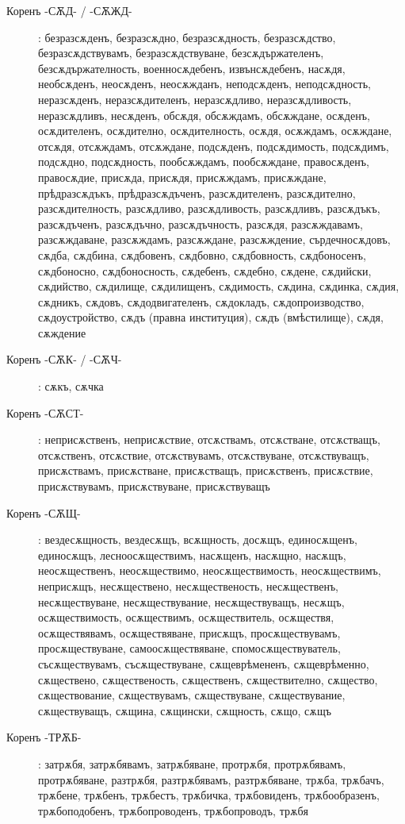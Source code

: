 \documentclass{article}
\begin{document}
\begin{description}
	\item[Коренъ -СѪД- / -СѪЖД-]: безразсѫденъ, безразсѫдно, безразсѫдность, безразсѫдство, безразсѫдствувамъ, безразсѫдствуване, безсѫдържателенъ, безсѫдържателность, военносѫдебенъ, извънсѫдебенъ, насѫдя, необсѫденъ, неосѫденъ, неосѫжданъ, неподсѫденъ, неподсѫдность, неразсѫденъ, неразсѫдителенъ, неразсѫдливо, неразсѫдливость, неразсѫдливъ, несѫденъ, обсѫдя, обсѫждамъ, обсѫждане, осѫденъ, осѫдителенъ, осѫдително, осѫдителность, осѫдя, осѫждамъ, осѫждане, отсѫдя, отсѫждамъ, отсѫждане, подсѫденъ, подсѫдимость, подсѫдимъ, подсѫдно, подсѫдность, пообсѫждамъ, пообсѫждане, правосѫденъ, правосѫдие, присѫда, присѫдя, присѫждамъ, присѫждане, прѣдразсѫдъкъ, прѣдразсѫдъченъ, разсѫдителенъ, разсѫдително, разсѫдителность, разсѫдливо, разсѫдливость, разсѫдливъ, разсѫдъкъ, разсѫдъченъ, разсѫдъчно, разсѫдъчность, разсѫдя, разсѫждавамъ, разсѫждаване, разсѫждамъ, разсѫждане, разсѫждение, сърдечносѫдовъ, сѫдба, сѫдбина, сѫдбовенъ, сѫдбовно, сѫдбовность, сѫдбоносенъ, сѫдбоносно, сѫдбоносность, сѫдебенъ, сѫдебно, сѫдене, сѫдийски, сѫдийство, сѫдилище, сѫдилищенъ, сѫдимость, сѫдина, сѫдинка, сѫдия, сѫдникъ, сѫдовъ, сѫдодвигателенъ, сѫдокладъ, сѫдопроизводство, сѫдоустройство, сѫдъ (правна институция), сѫдъ (вмѣстилище), сѫдя, сѫждение
	
	\item[Коренъ -СѪК- / -СѪЧ-]: сѫкъ, сѫчка
	
	\item[Коренъ -СѪСТ-]: неприсѫственъ, неприсѫствие, отсѫствамъ, отсѫстване, отсѫстващъ, отсѫственъ, отсѫствие, отсѫствувамъ, отсѫствуване, отсѫствуващъ, присѫствамъ, присѫстване, присѫстващъ, присѫственъ, присѫствие, присѫствувамъ, присѫствуване, присѫствуващъ
	
	\item[Коренъ -СѪЩ-]: вездесѫщность, вездесѫщъ, всѫщность, досѫщъ, единосѫщенъ, единосѫщъ, лесноосѫществимъ, насѫщенъ, насѫщно, насѫщъ, неосѫщественъ, неосѫществимо, неосѫществимость, неосѫществимъ, неприсѫщъ, несѫществено, несѫщественость, несѫщественъ, несѫществуване, несѫществувание, несѫществуващъ, несѫщъ, осѫществимость, осѫществимъ, осѫществитель, осѫществя, осѫществявамъ, осѫществяване, присѫщъ, просѫществувамъ, просѫществуване, самоосѫществяване, спомосѫществуватель, съсѫществувамъ, съсѫществуване, сѫщеврѣмененъ, сѫщеврѣменно, сѫществено, сѫщественость, сѫщественъ, сѫществително, сѫщество, сѫществование, сѫществувамъ, сѫществуване, сѫществувание, сѫществуващъ, сѫщина, сѫщински, сѫщность, сѫщо, сѫщъ
	
	\item[Коренъ -ТРѪБ-]: затрѫбя, затрѫбявамъ, затрѫбяване, протрѫбя, протрѫбявамъ, протрѫбяване, разтрѫбя, разтрѫбявамъ, разтрѫбяване, трѫба, трѫбачъ, трѫбене, трѫбенъ, трѫбестъ, трѫбичка, трѫбовиденъ, трѫбообразенъ, трѫбоподобенъ, трѫбопроводенъ, трѫбопроводъ, трѫбя
	

\end{description}
\end{document}
